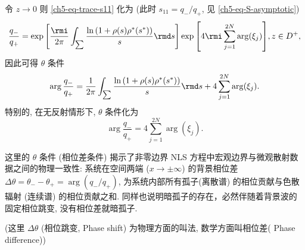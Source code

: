 令 $z \to 0$ 则 \eqref{ch5-eq-trace-s11} 化为 (此时 $s_{11} = q_{-}/q_{+}$, 见 \eqref{ch5-eq-S-asymptotic})
\begin{equation}
    \frac{q_{-}}{q_{+}} = \exp{ \left[ \frac{\rmi}{2 \pi} \int_{\sum} \frac{\ln{(1+\rho(s) \rho^{*}(s^{*}))}}{s} \rmd s \right]} \exp{ \left[ 4 \rmi \sum_{j=1}^{2N} \arg(\xi_{j}) \right]}, z \in D^{+},
\end{equation}
因此可得 $\theta$ 条件
\begin{equation}
    \arg{\frac{q_{-}}{q_{+}}} = \frac{1}{2\pi} \int_{\sum} \frac{\ln{(1+\rho(s) \rho^{*}(s^{*}))}}{s} \rmd s + 4 \sum_{j=1}^{2N} \arg(\xi_{j}).
\end{equation}
特别的, 在无反射情形下, $\theta$ 条件化为
\begin{equation}
    \arg{\frac{q_{-}}{q_{+}}} = 4 \sum_{j=1}^{2N} \arg(\xi_{j}).
\end{equation}
\begin{remark}
    这里的 $\theta$ 条件 (相位差条件) 揭示了非零边界 NLS 方程中宏观边界与微观散射数据之间的物理一致性: 系统在空间两端 ($x \to \pm\infty$) 的背景相位差 $\Delta\theta = \theta_{-} - \theta_{+}= \arg(q_-/q_+)$, 为系统内部所有孤子(离散谱) 的相位贡献与色散辐射 (连续谱) 的相位贡献之和. 同样也说明暗孤子的存在，必然伴随着背景波的固定相位跳变, 没有相位差就暗孤子.

    (这里 $\Delta \theta$ (相位跳变, Phase shift) 为物理方面的叫法, 数学方面叫相位差( Phase difference))
\end{remark}
